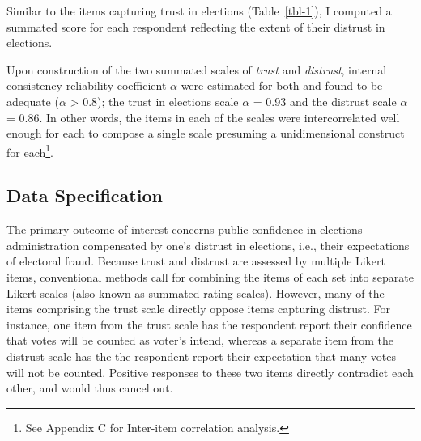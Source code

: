 \documentclass[
  12pt,
  letterpaper,
]{article}
\begin{document}
Similar to the items capturing trust in elections (Table~\ref{tbl-1}), I
computed a summated score for each respondent reflecting the extent of
their distrust in elections.

Upon construction of the two summated scales of \emph{trust} and
\emph{distrust}, internal consistency reliability coefficient \(\alpha\)
were estimated for both and found to be adequate (\(\alpha\)
\textgreater{} 0.8); the trust in elections scale \(\alpha\) = 0.93 and
the distrust scale \(\alpha\) = 0.86. In other words, the items in each
of the scales were intercorrelated well enough for each to compose a
single scale presuming a unidimensional construct for each\footnote{See
  Appendix C for Inter-item correlation analysis.}.

\subsection{Data Specification}\label{data-specification}

The primary outcome of interest concerns public confidence in elections
administration compensated by one's distrust in elections, i.e., their
expectations of electoral fraud. Because trust and distrust are assessed
by multiple Likert items, conventional methods call for combining the
items of each set into separate Likert scales (also known as summated
rating scales). However, many of the items comprising the trust scale
directly oppose items capturing distrust. For instance, one item from
the trust scale has the respondent report their confidence that votes
will be counted as voter's intend, whereas a separate item from the
distrust scale has the the respondent report their expectation that many
votes will not be counted. Positive responses to these two items
directly contradict each other, and would thus cancel out.
\end{document}
